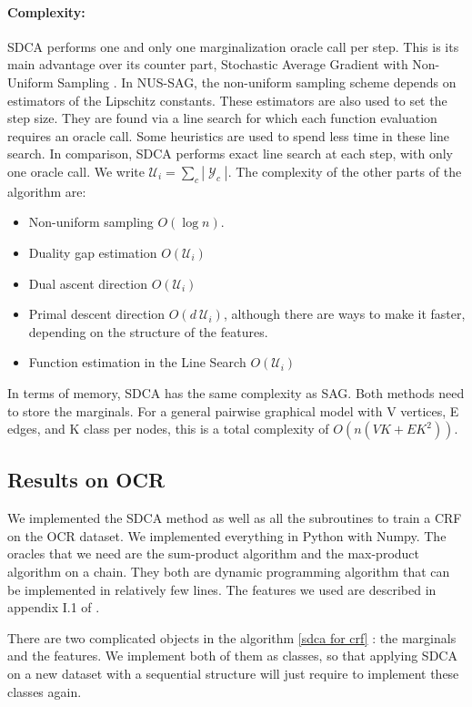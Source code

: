 \documentclass{article}
\DeclareMathOperator{\1}{\mathbb{1}}
\DeclareMathOperator{\Y}{\mathcal{Y}}
\begin{document}
\paragraph{Complexity:}
SDCA performs one and only one marginalization oracle call per step.
This is its main advantage over its counter part, Stochastic Average Gradient with Non-Uniform Sampling \cite{schmidt_non-uniform_2015}.
In NUS-SAG, the non-uniform sampling scheme depends on estimators of the Lipschitz constants.
These estimators are also used to set the step size.
They are found via a line search for which each function evaluation requires an oracle call.
Some heuristics are used to spend less time in these line search.
In comparison, SDCA performs exact line search at each step, with only one oracle call.
We write $\mathcal U_i = \sum_c |\Y_c|$. The complexity of the other parts of the algorithm are:
\begin{itemize}
	\item Non-uniform sampling $O(\log n)$.
	\item Duality gap estimation $O(\mathcal U_i)$
	\item Dual ascent direction $O(\mathcal U_i)$
	\item Primal descent direction $O(d \ \mathcal U_i)$, although there are ways to make it faster, depending on the structure of the features.
	\item Function estimation in the Line Search $O(\mathcal U_i)$
\end{itemize}

In terms of memory, SDCA has the same complexity as SAG. 
Both methods need to store the marginals.
For a general pairwise graphical model with V vertices, E edges, and K class per nodes, this is a total complexity of $O(n(VK + EK^2))$.

\subsection{Results on OCR}

We implemented the SDCA method as well as all the subroutines to train a CRF on the OCR dataset.
We implemented everything in Python with Numpy.
The oracles that we need are the sum-product algorithm and the max-product algorithm on a chain.
They both are dynamic programming algorithm that can be implemented in relatively few lines.
The features we used are described in appendix I.1 of \cite{osokin_minding_2016}.

There are two complicated objects in the algorithm \ref{sdca for crf} : the marginals and the features.
We implement both of them as classes, so that applying SDCA on a  new dataset with a sequential structure will just require to implement these classes again.
\end{document}
